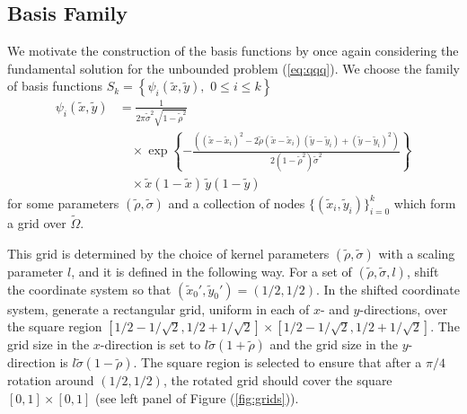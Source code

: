 \subsection{Basis Family} \label{sec:basis-family}
We motivate the construction of the basis functions by
once again considering the fundamental solution for the unbounded
problem (\ref{eq:qqq}). We choose the family of basis functions
$S_k = \left\{\psi_i(\tilde{x},\tilde{y}), \,\, 0 \leq i \leq k \right\}$
\begin{align}
  \psi_i(\tilde{x},\tilde{y}) &= \frac{1}{2\pi \tilde{\sigma}^2\sqrt{1-\tilde{\rho}^2} } \\
                              &\quad \times \exp\left\{ -\frac{\left( (\tilde{x} - \tilde{x}_i)^2 - 2\tilde{\rho} (\tilde{x}-\tilde{x}_i)(\tilde{y}-\tilde{y}_i) + (\tilde{y} - \tilde{y}_i)^2 \right)}{2(1-\tilde{\rho}^2)\tilde{\sigma}^2}  \right\} \nonumber \\
  &\quad \times \tilde{x}\left(1-\tilde{x}\right)\, \tilde{y}(1-\tilde{y}) \nonumber
\end{align}
for some parameters $(\tilde{\rho}, \tilde{\sigma})$ and a collection of nodes
$\{ (\tilde{x}_i,\tilde{y}_i) \}_{i=0}^k$ which form a grid over
$\tilde{\Omega}$.

This grid is determined by the choice of kernel parameters
$(\tilde{\rho}, \tilde{\sigma})$ with a scaling parameter $l$, and it
is defined in the following way. For a set of
$(\tilde{\rho}, \tilde{\sigma}, l)$, shift the coordinate system so
that $(\tilde{x}_0', \tilde{y}_0') = (1/2,1/2)$. In the shifted
coordinate system, generate a rectangular grid, uniform in each of
$x$- and $y$-directions, over the square region
$[1/2 - 1/\sqrt{2}, 1/2+1/\sqrt{2}] \times [1/2 - 1/\sqrt{2},
1/2+1/\sqrt{2}]$. The grid size in the $x$-direction is set to
$l\tilde{\sigma}(1+\tilde{\rho})$ and the grid size in the
$y$-direction is $l\tilde{\sigma}(1-\tilde{\rho})$. The square region
is selected to ensure that after a $\pi/4$ rotation around
$(1/2, 1/2)$, the rotated grid should cover the square
$[0, 1] \times [0, 1]$ (see left panel of Figure (\ref{fig:grids})).

